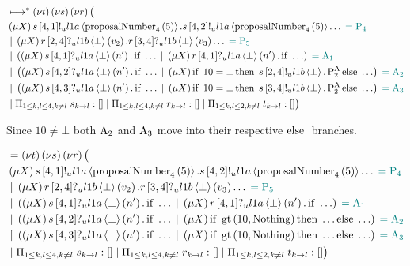 \begin{align*}
&\mapstostar
\NuChannels \big (\\
&\Mu{X} \SendUnreliableP{s}{4}{1}{\LOneA}{\proposalNumber{5}{4}}.\SendUnreliableP{s}{4}{2}{\LOneA}{\proposalNumber{5}{4}}\dots \comment{= \Proposer{4}}\\
&\Or \Mu{X} \ReceiveUnreliableP{r}{2}{4}{\LOneB}{\bot}{v_2}.\ReceiveUnreliableP{r}{3}{4}{\LOneB}{\bot}{v_3}\dots \comment{= \Proposer{5}}\\
&\Or \Paren{
    \Mu{X} \ReceiveUnreliableP{s}{4}{1}{\LOneA}{\bot}{n'}.\If{\dots}
    \Or \Mu{X} \ReceiveUnreliableP{r}{4}{1}{\LOneA}{\bot}{n'}.\If{\dots}
} \comment{=\Acceptor{1}}\\
&\Or \Paren{
    \Mu{X} \ReceiveUnreliableP{s}{4}{2}{\LOneA}{\bot}{n'}.\If{\dots}
    \Or \Mu{X} \If{10 = \bot} \Then{\SendUnreliableP{s}{2}{4}{\LOneB}{\bot}.\PaTwo} \Else{\dots}
} \comment{=\Acceptor{2}}\\
&\Or \Paren{
    \Mu{X} \ReceiveUnreliableP{s}{4}{3}{\LOneA}{\bot}{n'}.\If{\dots}
    \Or \Mu{X} \If{10 = \bot} \Then{\SendUnreliableP{s}{3}{4}{\LOneB}{\bot}.\PaTwo} \Else{\dots}
} \comment{=\Acceptor{3}}\\
&\Or \InnerSessionQueues{s}
\Or \InnerSessionQueues{r}
\Or \OuterSessionQueues
\big )
\end{align*}

Since $10 \neq \bot$ both $\operatorname{A_{2}}$ and $\operatorname{A_{3}}$ move into their respective $\Else$ branches.

\begin{align*}
&= \NuChannels \big (\\
&\Mu{X} \SendUnreliableP{s}{4}{1}{\LOneA}{\proposalNumber{5}{4}}.\SendUnreliableP{s}{4}{2}{\LOneA}{\proposalNumber{5}{4}}\dots \comment{= \Proposer{4}}\\
&\Or \Mu{X} \ReceiveUnreliableP{r}{2}{4}{\LOneB}{\bot}{v_2}.\ReceiveUnreliableP{r}{3}{4}{\LOneB}{\bot}{v_3}\dots \comment{= \Proposer{5}}\\
&\Or \Paren{
    \Mu{X} \ReceiveUnreliableP{s}{4}{1}{\LOneA}{\bot}{n'}.\If{\dots}
    \Or \Mu{X} \ReceiveUnreliableP{r}{4}{1}{\LOneA}{\bot}{n'}.\If{\dots}
} \comment{=\Acceptor{1}}\\
&\Or \Paren{
    \Mu{X} \ReceiveUnreliableP{s}{4}{2}{\LOneA}{\bot}{n'}.\If{\dots}
    \Or \Mu{X} \If{\greaterThan{10}{\Nothing}} \Then{\dots} \Else{\dots}
} \comment{=\Acceptor{2}}\\
&\Or \Paren{
    \Mu{X} \ReceiveUnreliableP{s}{4}{3}{\LOneA}{\bot}{n'}.\If{\dots}
    \Or \Mu{X} \If{\greaterThan{10}{\Nothing}} \Then{\dots} \Else{\dots}
} \comment{=\Acceptor{3}}\\
&\Or \InnerSessionQueues{s}
\Or \InnerSessionQueues{r}
\Or \OuterSessionQueues
\big )
\end{align*}

